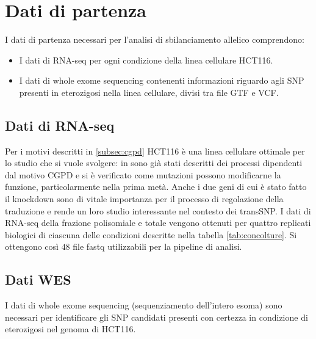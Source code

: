 \section{Dati di partenza}
\label{sec:datiinput}
I dati di partenza necessari per l'analisi di sbilanciamento allelico comprendono:
\begin{itemize}
  \item I dati di RNA-seq per ogni condizione della linea cellulare HCT116.
  \item I dati di whole exome sequencing contenenti informazioni riguardo agli SNP presenti in eterozigosi nella linea cellulare, divisi tra file GTF e VCF.
\end{itemize}

  \subsection{Dati di RNA-seq}
  Per i motivi descritti in \ref{subsec:cgpd} HCT116 \`e una linea cellulare ottimale per lo studio che si vuole svolgere: in \cite{nutlin} sono gi\`a stati descritti dei processi dipendenti dal motivo CGPD e si \`e verificato come mutazioni possono modificarne la funzione, particolarmente nella prima met\`a.
  Anche i due geni di cui \`e stato fatto il knockdown sono di vitale importanza per il processo di regolazione della traduzione e rende un loro studio interessante nel contesto dei transSNP.
  I dati di RNA-seq della frazione polisomiale e totale vengono ottenuti per quattro replicati biologici di ciascuna delle condizioni descritte nella tabella \ref{tab:concolture}.
  Si ottengono cos\`i $48$ file fastq utilizzabili per la pipeline di analisi.

  \subsection{Dati WES}
  I dati di whole exome sequencing (sequenziamento dell'intero esoma) sono necessari per identificare gli SNP candidati presenti con certezza in condizione di eterozigosi nel genoma di HCT116.
